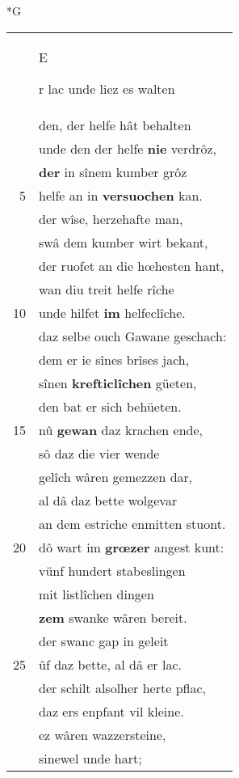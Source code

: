 \documentclass[8pt,a4paper,notitlepage]{article}
\begin{document}
\begin{table}[ht]
\begin{minipage}[t]{0.5\linewidth}
\small
\begin{center}*G
\end{center}
\begin{tabular}{rl}
 & \begin{large}E\end{large}r lac unde liez es walten\\ 
 & den, der helfe hât behalten\\ 
 & unde den der helfe \textbf{nie} verdrôz,\\ 
 & \textbf{der} in sînem kumber grôz\\ 
5 & helfe an in \textbf{versuochen} kan.\\ 
 & der wîse, herzehafte man,\\ 
 & swâ dem kumber wirt bekant,\\ 
 & der ruofet an die hœhesten hant,\\ 
 & wan diu treit helfe rîche\\ 
10 & unde hilfet \textbf{im} helfeclîche.\\ 
 & daz selbe ouch Gawane geschach:\\ 
 & dem er ie sînes brîses jach,\\ 
 & sînen \textbf{krefticlîchen} güeten,\\ 
 & den bat er sich behüeten.\\ 
15 & nû \textbf{gewan} daz krachen ende,\\ 
 & sô daz die vier wende\\ 
 & gelîch wâren gemezzen dar,\\ 
 & al dâ daz bette wolgevar\\ 
 & an dem estriche enmitten stuont.\\ 
20 & dô wart im \textbf{grœzer} angest kunt:\\ 
 & vünf hundert stabeslingen\\ 
 & mit listlîchen dingen\\ 
 & \textbf{zem} swanke wâren bereit.\\ 
 & der swanc gap in geleit\\ 
25 & ûf daz bette, al dâ er lac.\\ 
 & der schilt alsolher herte pflac,\\ 
 & daz ers enpfant vil kleine.\\ 
 & ez wâren wazzersteine,\\ 
 & sinewel unde hart;\\ 

\end{tabular}
\end{minipage}
\end{table}
\end{document}
